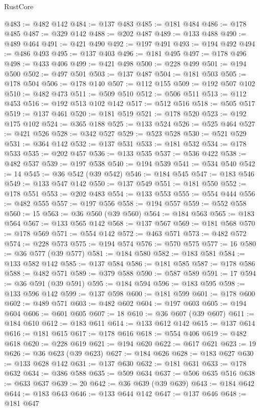 \begin{lexlean}{RustCore}
\begin{coremodule}
@483 := @482 @142
@484 := @137 @483
@485 := @181 @484
@486 := @178 @485
@487 := @329 @142
@488 := @202 @487
@489 := @133 @488
@490 := @489 @464
@491 := @421 @490
@492 := @197 @491
@493 := @194 @492
@494 := @486 @493
@495 := @137 @403
@496 := @181 @495
@497 := @178 @496
@498 := @433 @406
@499 := @421 @498
@500 := @228 @499
@501 := @194 @500
@502 := @497 @501
@503 := @137 @487
@504 := @181 @503
@505 := @178 @504
@506 := @178 @140
@507 := @112 @155
@509 := @192 @507 @102
@510 := @482 @473
@511 := @509 @510
@512 := @506 @511
@513 := @112 @453
@516 := @192 @513 @102 @142
@517 := @512 @516
@518 := @505 @517
@519 := @137 @461
@520 := @181 @519
@521 := @178 @520
@523 := @192 @175 @102
@524 := @365 @188
@525 := @133 @524
@526 := @525 @464
@527 := @421 @526
@528 := @342 @527
@529 := @523 @528
@530 := @521 @529
@531 := @364 @142
@532 := @137 @531
@533 := @181 @532
@534 := @178 @533
@535 := @202 @457
@536 := @133 @535
@537 := @536 @422
@538 := @482 @537
@539 := @197 @538
@540 := @194 @539
@541 := @534 @540
@542 := 14
@545 := @36 @542 (@39 @542)
@546 := @184 @545
@547 := @183 @546
@549 := @133 @547 @142
@550 := @137 @549
@551 := @181 @550
@552 := @178 @551
@553 := @202 @483
@554 := @133 @553
@555 := @554 @444
@556 := @482 @555
@557 := @197 @556
@558 := @194 @557
@559 := @552 @558
@560 := 15
@563 := @36 @560 (@39 @560)
@564 := @184 @563
@565 := @183 @564
@567 := @133 @565 @142
@568 := @137 @567
@569 := @181 @568
@570 := @178 @569
@571 := @554 @142
@572 := @463 @571
@573 := @482 @572
@574 := @228 @573
@575 := @194 @574
@576 := @570 @575
@577 := 16
@580 := @36 @577 (@39 @577)
@581 := @184 @580
@582 := @183 @581
@584 := @133 @582 @142
@585 := @137 @584
@586 := @181 @585
@587 := @178 @586
@588 := @482 @571
@589 := @379 @588
@590 := @587 @589
@591 := 17
@594 := @36 @591 (@39 @591)
@595 := @184 @594
@596 := @183 @595
@598 := @133 @596 @142
@599 := @137 @598
@600 := @181 @599
@601 := @178 @600
@602 := @489 @571
@603 := @482 @602
@604 := @197 @603
@605 := @194 @604
@606 := @601 @605
@607 := 18
@610 := @36 @607 (@39 @607)
@611 := @184 @610
@612 := @183 @611
@614 := @133 @612 @142
@615 := @137 @614
@616 := @181 @615
@617 := @178 @616
@618 := @554 @406
@619 := @482 @618
@620 := @228 @619
@621 := @194 @620
@622 := @617 @621
@623 := 19
@626 := @36 @623 (@39 @623)
@627 := @184 @626
@628 := @183 @627
@630 := @133 @628 @142
@631 := @137 @630
@632 := @181 @631
@633 := @178 @632
@634 := @386 @588
@635 := @509 @634
@637 := @506 @635 @516
@638 := @633 @637
@639 := 20
@642 := @36 @639 (@39 @639)
@643 := @184 @642
@644 := @183 @643
@646 := @133 @644 @142
@647 := @137 @646
@648 := @181 @647

\end{coremodule}
\end{lexlean}
